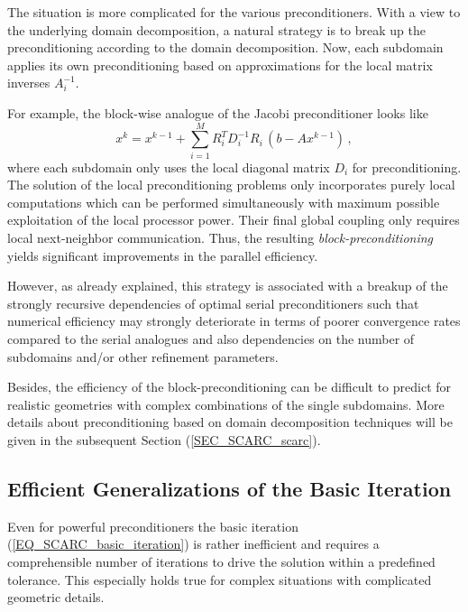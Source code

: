 The situation is more complicated for the various preconditioners. %
With a view to the underlying domain decomposition, a natural strategy is to break up the preconditioning according to the domain decomposition. Now, each subdomain applies its own preconditioning based on approximations for the local matrix inverses $A_i^{-1}$. 

\newpage
For example, the block-wise analogue of the Jacobi preconditioner looks like
\[ x^k = x^{k-1} + \sum_{i=1}^M R_i^T D_i^{-1} R_i\, (b - Ax^{k-1})\,, \]
where each subdomain only uses the local diagonal matrix $D_i$ for preconditioning.
The solution of the local preconditioning problems only incorporates purely local computations which can be performed simultaneously with maximum possible exploitation of the local processor power. Their final global coupling only requires local next-neighbor communication. 
Thus, the resulting {\it block-preconditioning} yields significant improvements in the parallel efficiency. 

However, as already explained, this strategy is associated with a breakup of the strongly recursive dependencies of optimal serial preconditioners such that numerical efficiency may strongly deteriorate in terms of poorer convergence rates compared to the serial analogues and also dependencies on the number of subdomains and/or other refinement parameters. 

Besides, the efficiency of the block-preconditioning can be difficult to predict for realistic geometries with complex combinations of the single subdomains.
More details about preconditioning based on domain decomposition techniques will be given in the subsequent Section (\ref{SEC_SCARC_scarc}). 

\subsection{Efficient Generalizations of the Basic Iteration}
\label{SEC_SCARC_generalizations}
Even for powerful preconditioners the  basic iteration (\ref{EQ_SCARC_basic_iteration}) is rather inefficient and requires a comprehensible number of iterations to drive the solution within a predefined tolerance. This especially holds true for complex situations with complicated geometric details.


